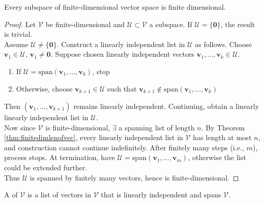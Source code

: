 \begin{proposition} \label{prop:everysubspacefindimisfindim} Every subspace of finite-dimensional vector space is finite dimensional.
\begin{proof}
Let $\mathcal{V}$ be finite-dimensional and $\mathcal{U} \subset \mathcal{V}$ a subspace. If $\mathcal{U} = \{\mathbf{0}\}$, the result is trivial.\\
Assume $\mathcal{U} \neq \{ \mathbf{0} \}$. Construct a linearly independent list in $\mathcal{U}$ as follows. Choose $\mathbf{v}_1 \in \mathcal{U}$, $\mathbf{v}_1 \neq \mathbf{0}$. Suppose chosen linearly independent vectors $\mathbf{v}_1, \ldots, \mathbf{v}_{k} \in \mathcal{U}$.
\begin{enumerate}[label=\roman*.]
\setlength{\itemsep}{0pt}
\item If $\mathcal{U} = \text{span}(\mathbf{v}_1, \ldots, \mathbf{v}_k)$, stop
\item Otherwise, choose $\mathbf{v}_{k+1} \in \mathcal{U}$ such that $\mathbf{v}_{k+1} \notin \text{span}(\mathbf{v}_1, \ldots, \mathbf{v}_k)$
\end{enumerate}
Then $(\mathbf{v}_1, \ldots, \mathbf{v}_{k+1})$ remains linearly independent. Continuing, obtain a linearly linearly independent list in $\mathcal{U}$.\\
Now since $\mathcal{V}$ is finite-dimensional, $\exists$ a spanning list of length $n$. By Theorem \ref{thm:finitedimlenofvec}, every linearly independent list in $\mathcal{V}$ has length at most $n$, and construction cannot continue indefinitely. After finitely many steps (i.e., $m$), process stops. At termination, have $\mathcal{U} = \text{span}(\mathbf{v}_1, \ldots, \mathbf{v}_m)$, otherwise the list could be extended further.\\
Thus $\mathcal{U}$ is spanned by finitely many vectors, hence is finite-dimensional.
\end{proof}
\end{proposition}

\begin{definition} A  of $\mathcal{V}$ is a list of vectors in $\mathcal{V}$ that is linearly independent and spans $\mathcal{V}$.
\end{definition}

